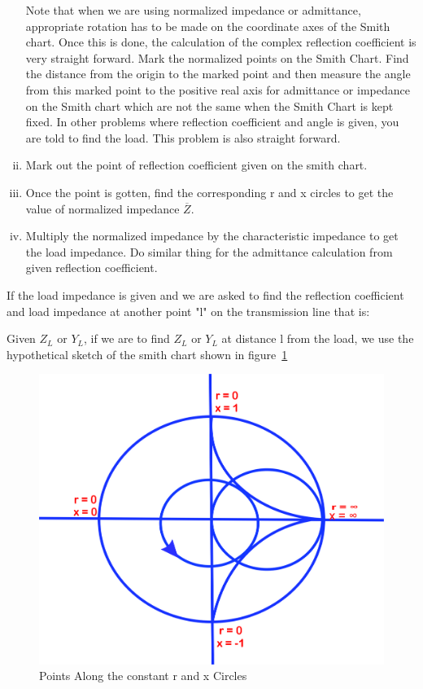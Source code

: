 \begin{enumerate}[(i)]
Note that when we are using normalized impedance or admittance, appropriate rotation has to be made on the coordinate axes of the Smith chart. Once this is done, the calculation of the complex reflection coefficient is very straight forward. Mark the normalized points on the Smith Chart. Find the distance from the origin to the marked point and then measure the angle from this marked point to the positive real axis for admittance or impedance on the  Smith chart which are not the same when the Smith Chart is kept fixed. In other problems where reflection coefficient and angle is given, you are told to find the load. This problem is also straight forward.
\item Mark out the point of  reflection coefficient given on the smith chart.
\item Once the point is gotten, find the corresponding r and x circles to get the value of normalized impedance $\overline{Z}$.
\item Multiply the normalized impedance by the characteristic impedance to get the load impedance. Do similar thing for the admittance calculation from given reflection coefficient.
\end{enumerate}


If the load impedance is given and we are asked to find the reflection coefficient and load impedance at another point "l" on the transmission line that is:

Given $Z_L$ or $Y_L$, if we are to find $Z_L$ or $Y_L$ at distance l from the load, we use the hypothetical sketch of the smith chart shown in figure~\ref{fig:uytrewsxcvbj}
\begin{figure}[h]
\centering
\includegraphics[width=0.5\linewidth]{./graphics/uytrewsxcvbj}
\caption{Points Along the constant r and x Circles}
\label{fig:uytrewsxcvbj}
\end{figure}

